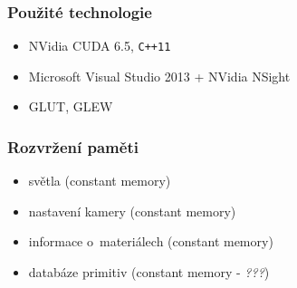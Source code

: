 \documentclass{beamer}
\begin{document}
	{
\begin{frame}[plain]
\end{frame}
}
	

	\begin{frame}[t,fragile]
		\frametitle{Použité technologie}
		
		\begin{itemize}
			\item NVidia CUDA 6.5, \verb!C++11!
			\item Microsoft Visual Studio 2013 + NVidia NSight
			\item GLUT, GLEW
		\end{itemize}	
			

	\end{frame}
	

	\begin{frame}[t,fragile]
		\frametitle{Rozvržení paměti}					
		\begin{itemize}
	\item světla (constant memory)
	\item nastavení kamery (constant memory)
	\item informace o~materiálech (constant memory)
	\item databáze primitiv (constant memory - \textit{???})
\end{itemize}
		
	
	\end{frame}
	
\end{document}
